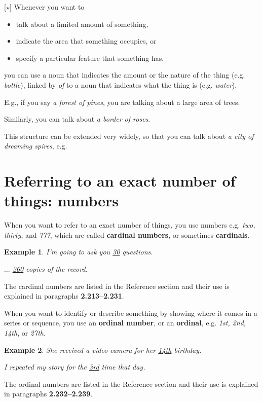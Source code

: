 \documentclass[oneside]{book}
\numberwithin{equation}{section}
\newtheorem{example}{Example}[section]
\begin{document}
%
\noindent{} [$\star$] Whenever you want to
\begin{itemize}
    \item[(i)] talk about a limited amount of something,
    \item[(ii)] indicate the area that something occupies, or
    \item[(iii)] specify a particular feature that something has,
\end{itemize}
you can use a noun that indicates the amount or the nature of the thing (e.g. \textit{bottle}), linked by \textit{of} to a noun that indicates what the thing is (e.g. \textit{water}).

%
E.g., if you say \textit{a forest of pines}, you are talking about a large area of trees.

Similarly, you can talk about \textit{a border of roses}.

%
This structure can be extended very widely, so that you can talk about \textit{a city of dreaming spires}, e.g.

\section{Referring to an exact number of things: numbers}
\noindent{} When you want to refer to an exact number of things, you use numbers e.g. \textit{two, thirty}, and \textit{777}, which are called \textbf{cardinal numbers}, or sometimes \textbf{cardinals}.
\begin{example}
    I'm going to ask you \underline{30} questions.
    
    $\ldots$ \underline{260} copies of the record.
\end{example}
The cardinal numbers are listed in the Reference section and their use is explained in paragraphs \textbf{2.213--2.231}.

%
\noindent{} When you want to identify or describe something by showing where it comes in a series or sequence, you use an \textbf{ordinal number}, or an \textbf{ordinal}, e.g. \textit{1st, 2nd, 14th}, or \textit{27th}.
\begin{example}
    She received a video camera for her \underline{14th} birthday.
    
    I repeated my story for the \underline{3rd} time that day.
\end{example}
The ordinal numbers are listed in the Reference section and their use is explained in paragraphs \textbf{2.232--2.239}.
\end{document}
